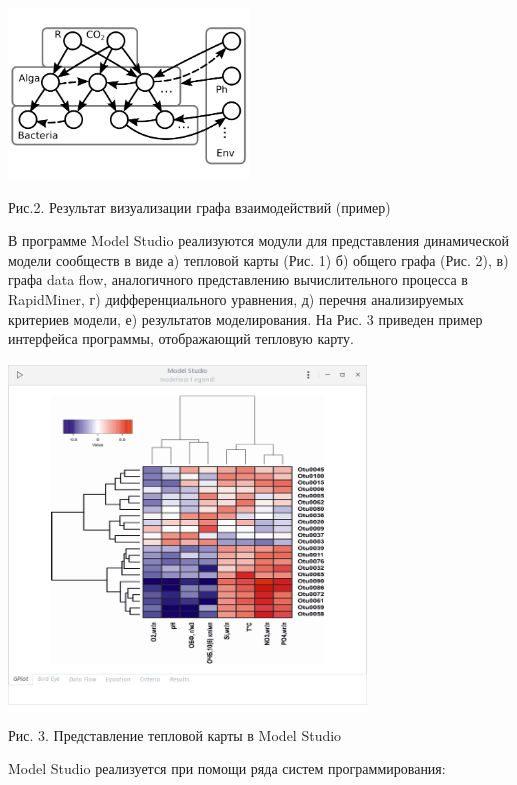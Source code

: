 \documentclass[a4paper,12pt,openany,final]{extreport}
\begin{document}
\includegraphics[width=2.50694in,height=1.78125in]{media/image20.png}

Рис.2. Результат визуализации графа взаимодействий (пример)

В программе Model Studio реализуются модули для представления
динамической модели сообществ в виде а) тепловой карты (Рис. 1) б)
общего графа (Рис. 2), в) графа data flow, аналогичного представлению
вычислительного процесса в RapidMiner, г) дифференциального уравнения,
д) перечня анализируемых критериев модели, е) результатов моделирования.
На Рис. 3 приведен пример интерфейса программы, отображающий тепловую
карту.

\includegraphics[width=3.73958in,height=3.58611in]{media/image21.png}

Рис. 3. Представление тепловой карты в Model Studio

Model Studio реализуется при помощи ряда систем программирования:
\end{document}
